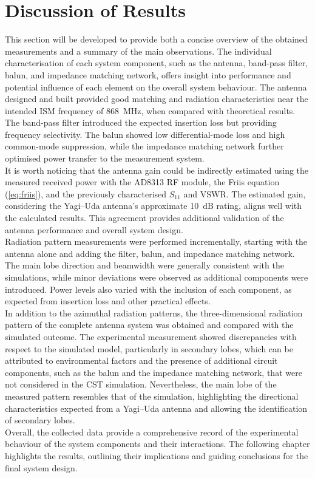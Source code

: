 \section{Discussion of Results}

This section will be developed to provide both a concise overview of the obtained measurements and a summary of the main observations. The individual characterisation of each system component, such as the antenna, band-pass filter, balun, and impedance matching network, offers insight into performance and potential influence of each element on the overall system behaviour. The antenna designed and built provided good matching and radiation characteristics near the intended ISM frequency of 868~MHz, when compared with theoretical results. The band-pass filter introduced the expected insertion loss but providing frequency selectivity. The balun showed low differential-mode loss and high common-mode suppression, while the impedance matching network further optimised power transfer to the measurement system.\\
\vspace{-0.1em}
\indent It is worth noticing that the antenna gain could be indirectly estimated using the measured received power with the AD8313 RF module, the Friis equation (\ref{eq:friis}), and the previously characterised $S_{11}$ and VSWR. The estimated gain, considering the Yagi–Uda antenna’s approximate 10~dB rating, aligns well with the calculated results. This agreement provides additional validation of the antenna performance and overall system design.\\
\vspace{-0.1em}
\indent Radiation pattern measurements were performed incrementally, starting with the antenna alone and adding the filter, balun, and impedance matching network. The main lobe direction and beamwidth were generally consistent with the simulations, while minor deviations were observed as additional components were introduced. Power levels also varied with the inclusion of each component, as expected from insertion loss and other practical effects.\\
\vspace{-0.1em}
\indent In addition to the azimuthal radiation patterns, the three-dimensional radiation pattern of the complete antenna system was obtained and compared with the simulated outcome. The experimental measurement showed discrepancies with respect to the simulated model, particularly in secondary lobes, which can be attributed to environmental factors and the presence of additional circuit components, such as the balun and the impedance matching network, that were not considered in the CST simulation. Nevertheless, the main lobe of the measured pattern resembles that of the simulation, highlighting the directional characteristics expected from a Yagi–Uda antenna and allowing the identification of secondary lobes.\\
\vspace{-0.1em}
\indent Overall, the collected data provide a comprehensive record of the experimental behaviour of the system components and their interactions. The following chapter highlights the results, outlining their implications and guiding conclusions for the final system design.
